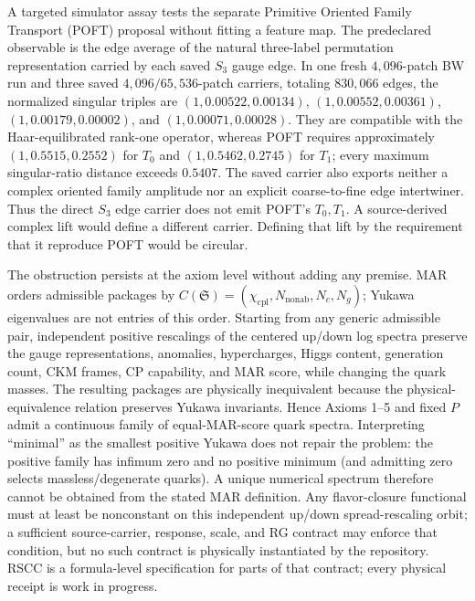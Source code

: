 \documentclass[11pt]{article}
\begin{document}
A targeted simulator assay tests the separate Primitive Oriented Family Transport (POFT) proposal
without fitting a feature map.  The predeclared observable is the edge average of the natural
three-label permutation representation carried by each saved $S_3$ gauge edge.  In one fresh
$4{,}096$-patch BW run and three saved $4{,}096/65{,}536$-patch carriers, totaling
$830{,}066$ edges, the normalized singular triples are
$(1,0.00522,0.00134)$, $(1,0.00552,0.00361)$,
$(1,0.00179,0.00002)$, and $(1,0.00071,0.00028)$.
They are compatible with the Haar-equilibrated rank-one operator, whereas POFT requires
approximately $(1,0.5515,0.2552)$ for $T_0$ and
$(1,0.5462,0.2745)$ for $T_1$; every maximum singular-ratio distance exceeds $0.5407$.
The saved carrier also exports neither a complex oriented family amplitude nor an explicit
coarse-to-fine edge intertwiner.  Thus the direct $S_3$ edge carrier does not emit POFT's
$T_0,T_1$.  A source-derived complex lift would define a different carrier. Defining that lift by
the requirement that it reproduce POFT would be circular.

The obstruction persists at the axiom level without adding any premise.  MAR orders admissible
packages by \(C(\mathfrak S)=(\chi_{\mathrm{cpl}},N_{\mathrm{nonab}},N_c,N_g)\); Yukawa
eigenvalues are not entries of this order.  Starting from any generic admissible pair, independent
positive rescalings of the centered up/down log spectra preserve the gauge representations,
anomalies, hypercharges, Higgs content, generation count, CKM frames, CP capability, and MAR score,
while changing the quark masses.  The resulting packages are physically inequivalent because the
physical-equivalence relation preserves Yukawa invariants.  Hence Axioms 1--5 and fixed \(P\) admit
a continuous family of equal-MAR-score quark spectra.  Interpreting ``minimal'' as the smallest
positive Yukawa does not repair the problem: the positive family has infimum zero and no positive
minimum (and admitting zero selects massless/degenerate quarks).  A unique numerical spectrum
therefore cannot be obtained from the stated MAR definition. Any flavor-closure functional
must at least be nonconstant on this independent up/down spread-rescaling orbit; a sufficient
source-carrier, response, scale, and RG contract may enforce that condition, but no such contract
is physically instantiated by the repository. RSCC is a formula-level specification for parts of
that contract; every physical receipt is work in progress.
\end{document}
